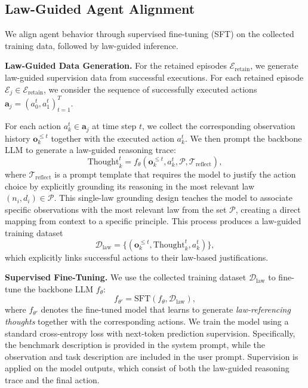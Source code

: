 \documentclass{article}
\theoremstyle{plain}
\theoremstyle{definition}
\theoremstyle{remark}
\newcommand{\AC}[1]{\textcolor{red}{~AC: {#1}}}
\begin{document}
\subsection{Law-Guided Agent Alignment}

We align agent behavior through supervised fine-tuning (SFT) on the collected training data, followed by law-guided inference.

\textbf{Law-Guided Data Generation.} 
For the retained episodes $\mathcal{E}_{\text{retain}}$, we generate law-guided supervision data from successful executions. For each retained episode $\mathcal{E}_j \in \mathcal{E}_{\text{retain}}$, we consider the sequence of successfully executed actions $\mathbf{a}_j = (a_0^t, a_1^t)_{t=1}^{T}$. %

For each action $a_k^t \in \mathbf{a}_j$ at time step $t$, we collect the corresponding observation history $\mathbf{o}_k^{\leq t}$ together with the executed action $a_k^t$. We then prompt the backbone LLM to generate a law-guided reasoning trace:
\begin{equation}
\text{Thought}_k^t = f_\theta(\mathbf{o}_k^{\leq t}, a_k^t, \mathcal{P}, \mathcal{T}_{\text{reflect}}),
\end{equation}
where $\mathcal{T}_{\text{reflect}}$ is a prompt template that requires the model to justify the action choice by explicitly grounding its reasoning in the most relevant law $(n_i, d_i) \in \mathcal{P}$. This single-law grounding design teaches the model to associate specific observations with the most relevant law from the set $\mathcal{P}$, creating a direct mapping from context to a specific principle. This process produces a law-guided training dataset
\begin{equation}
\mathcal{D}_{\text{law}} = \{(\mathbf{o}_k^{\leq t}, \text{Thought}_k^t, a_k^t)\},
\end{equation}
which explicitly links successful actions to their law-based justifications.

\textbf{Supervised Fine-Tuning.} We use the collected training dataset $\mathcal{D}_{\text{law}}$ to fine-tune the backbone LLM $f_\theta$:
\begin{equation}
f_{\theta'} = \text{SFT}(f_\theta, \mathcal{D}_{\text{law}}),
\end{equation}
where $f_{\theta'}$ denotes the fine-tuned model that learns to generate \emph{law-referencing thoughts} together with the corresponding actions. We train the model using a standard cross-entropy loss with next-token prediction supervision. Specifically, the benchmark description is provided in the system prompt, while the observation and task description are included in the user prompt. Supervision is applied on the model outputs, which consist of both the law-guided reasoning trace and the final action.
\end{document}
